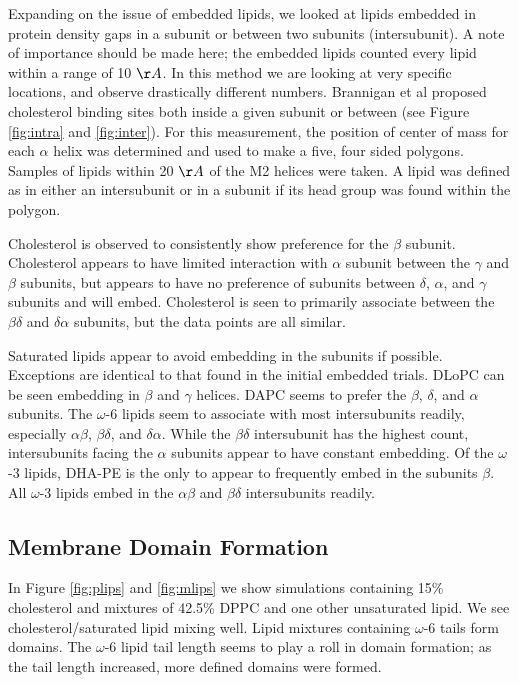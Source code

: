 \documentclass[10pt, letterpaper]{article}
\begin{document}
Expanding on the issue of embedded lipids, we looked at lipids embedded in protein density gaps in a subunit or between two subunits (intersubunit). A note of importance should be made here; the embedded lipids counted every lipid within a range of 10 $\AA$. In this method we are looking at very specific locations, and observe drastically different numbers. Brannigan et al proposed cholesterol binding sites both inside a given subunit or between (see Figure \ref{fig:intra} and \ref{fig:inter}). For this measurement, the position of center of mass for each $\alpha$ helix was determined and used to make a five, four sided polygons. Samples of lipids within 20 $\AA$ of the M2 helices were taken. A lipid was defined as in either an intersubunit or in a subunit if its head group was found within the polygon. 

Cholesterol is observed to consistently show preference for the $\beta$ subunit. Cholesterol appears to have limited interaction with $\alpha$ subunit between the $\gamma$ and $\beta$ subunits, but appears to have no preference of subunits between $\delta$, $\alpha$, and $\gamma$ subunits and will embed. Cholesterol is seen to primarily associate between the $\beta\delta$ and $\delta\alpha$ subunits, but the data points are all similar. 

Saturated lipids appear to avoid embedding in the subunits if possible. Exceptions are identical to that found in the initial embedded trials. DLoPC can be seen embedding in $\beta$ and $\gamma$ helices. DAPC seems to prefer the $\beta$, $\delta$, and $\alpha$ subunits. The $\omega$-6 lipids seem to associate with most intersubunits readily, especially $\alpha\beta$, $\beta\delta$, and $\delta\alpha$. While the $\beta\delta$ intersubunit has the highest count, intersubunits facing the $\alpha$ subunits appear to have constant embedding. Of the $\omega$-3 lipids, DHA-PE is the only to appear to frequently embed in the subunits $\beta$. All $\omega$-3 lipids embed in the $\alpha\beta$ and $\beta\delta$ intersubunits readily. 

\subsection{Membrane Domain Formation}

In Figure \ref{fig:plips} and \ref{fig:mlips} we show simulations containing 15\% cholesterol and mixtures of 42.5\% DPPC and one other unsaturated lipid. We see cholesterol/saturated lipid mixing well. Lipid mixtures containing $\omega$-6 tails form domains. The $\omega$-6 lipid tail length seems to play a roll in domain formation; as the tail length increased, more defined domains were formed.
\end{document}
